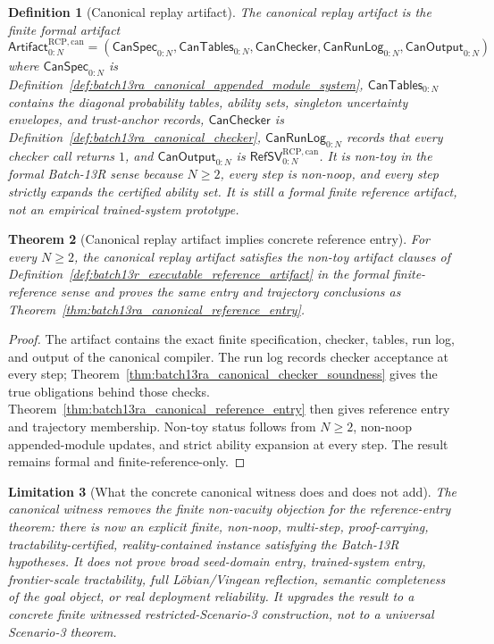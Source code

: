 \documentclass[11pt]{article}
\newtheorem{theorem}{Theorem}[section]
\newtheorem{definition}[theorem]{Definition}
\newtheorem{limitation}[theorem]{Limitation}
\newcommand{\1}{\mathbf{1}}
\newcommand{\RCP}{\mathrm{RCP}}
\begin{document}
\begin{definition}[Canonical replay artifact]
\label{def:batch13ra_canonical_replay_artifact}
The canonical replay artifact is the finite formal artifact
\[
\mathsf{Artifact}_{0:N}^{\RCP,\mathrm{can}}
=(\mathsf{CanSpec}_{0:N},\mathsf{CanTables}_{0:N},\mathsf{CanChecker},\mathsf{CanRunLog}_{0:N},\mathsf{CanOutput}_{0:N})
\]
where \(\mathsf{CanSpec}_{0:N}\) is Definition~\ref{def:batch13ra_canonical_appended_module_system}, \(\mathsf{CanTables}_{0:N}\) contains the diagonal probability tables, ability sets, singleton uncertainty envelopes, and trust-anchor records, \(\mathsf{CanChecker}\) is Definition~\ref{def:batch13ra_canonical_checker}, \(\mathsf{CanRunLog}_{0:N}\) records that every checker call returns \(1\), and \(\mathsf{CanOutput}_{0:N}\) is \(\mathsf{RefSV}_{0:N}^{\RCP,\mathrm{can}}\).  It is non-toy in the formal Batch-13R sense because \(N\ge2\), every step is non-noop, and every step strictly expands the certified ability set.  It is still a formal finite reference artifact, not an empirical trained-system prototype.
\end{definition}

\begin{theorem}[Canonical replay artifact implies concrete reference entry]
\label{thm:batch13ra_canonical_replay_artifact_reference_entry}
For every \(N\ge2\), the canonical replay artifact satisfies the non-toy artifact clauses of Definition~\ref{def:batch13r_executable_reference_artifact} in the formal finite-reference sense and proves the same entry and trajectory conclusions as Theorem~\ref{thm:batch13ra_canonical_reference_entry}.
\end{theorem}

\begin{proof}
The artifact contains the exact finite specification, checker, tables, run log, and output of the canonical compiler.  The run log records checker acceptance at every step; Theorem~\ref{thm:batch13ra_canonical_checker_soundness} gives the true obligations behind those checks.  Theorem~\ref{thm:batch13ra_canonical_reference_entry} then gives reference entry and trajectory membership.  Non-toy status follows from \(N\ge2\), non-noop appended-module updates, and strict ability expansion at every step.  The result remains formal and finite-reference-only.
\end{proof}

\begin{limitation}[What the concrete canonical witness does and does not add]
\label{lim:batch13ra_canonical_witness_scope}
The canonical witness removes the finite non-vacuity objection for the reference-entry theorem: there is now an explicit finite, non-noop, multi-step, proof-carrying, tractability-certified, reality-contained instance satisfying the Batch-13R hypotheses.  It does not prove broad seed-domain entry, trained-system entry, frontier-scale tractability, full L\"obian/Vingean reflection, semantic completeness of the goal object, or real deployment reliability.  It upgrades the result to a concrete finite witnessed restricted-Scenario-3 construction, not to a universal Scenario-3 theorem.
\end{limitation}
\end{document}
